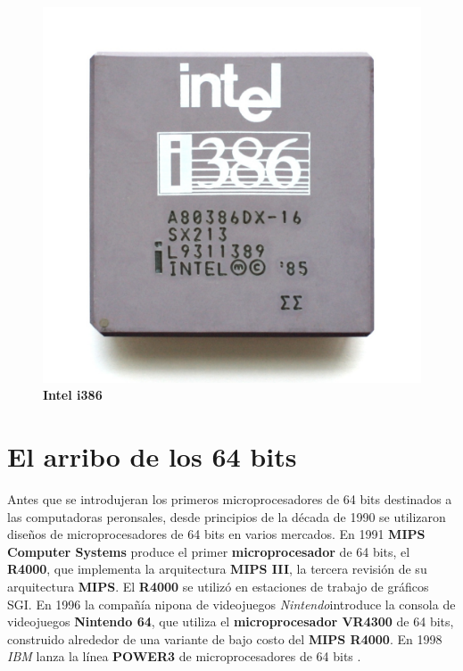 \begin{figure}[htb]
	\centering
	\includegraphics[scale = 0.1]{Graphics/Intel_i386DX.jpg}
	\caption{\textbf{Intel i386}}
	\label{fig:18}
\end{figure}
\newpage

\section{El arribo de los 64 bits}
Antes que se introdujeran los primeros microprocesadores de 64 bits destinados a las computadoras peronsales, desde principios de la década de
1990 se utilizaron diseños de microprocesadores de 64 bits en varios mercados. En 1991 \textbf{MIPS Computer Systems} produce el primer \textbf
{microprocesador} de 64 bits, el \textbf{R4000}, que implementa la arquitectura \textbf{MIPS III}, la tercera revisión de su arquitectura \textbf{MIPS}.
El \textbf{R4000} se utilizó en estaciones de trabajo de gráficos SGI. En 1996 la compañía nipona de videojuegos \emph{Nintendo}introduce la consola de
videojuegos \textbf{Nintendo 64}, que utiliza el \textbf{microprocesador VR4300} de 64 bits, construido alrededor de una variante de bajo costo del
\textbf{MIPS R4000}. En 1998 \emph{IBM} lanza la línea \textbf{POWER3} de microprocesadores de 64 bits . 

